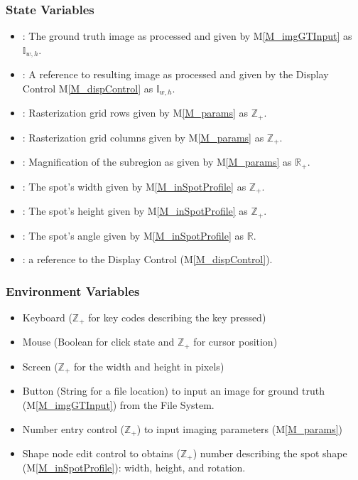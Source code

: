 \documentclass[12pt, titlepage]{article}
\newcommand{\mref}[1]{M\ref{#1}}
\newcommand{\mrefp}[1]{(\mref{#1})}
\begin{document}
\subsubsection{State Variables}
\begin{itemize}
  \item {}: The ground truth image as processed and given by \mref{M_imgGTInput} as $\mathbb{I}_{w,h}$.
  \item {}: A reference to resulting image as processed and given by the Display Control \mref{M_dispControl} as $\mathbb{I}_{w,h}$.
  \item {}: Rasterization grid rows given by \mref{M_params} as $\mathbb{Z}_+$.
  \item {}: Rasterization grid columns given by \mref{M_params} as $\mathbb{Z}_+$.
  \item {}: Magnification of the subregion as given by \mref{M_params} as $\mathbb{R}_+$.
  \item {}: The spot's width given by \mref{M_inSpotProfile} as $\mathbb{Z}_+$.
  \item {}: The spot's height given by \mref{M_inSpotProfile} as $\mathbb{Z}_+$.
  \item {}: The spot's angle given by \mref{M_inSpotProfile} as $\mathbb{R}$.
  \item {}: a reference to the Display Control \mrefp{M_dispControl}.
\end{itemize}

\subsubsection{Environment Variables}
\begin{itemize}
  \item Keyboard ($\mathbb{Z}_+$ for key codes describing the key pressed)
  \item Mouse (Boolean for click state and $\mathbb{Z}_+$ for cursor position)
  \item Screen ($\mathbb{Z}_+$ for the width and height in pixels)
  \item Button (String for a file location) to input an image for ground truth \mrefp{M_imgGTInput} from the File System.
  \item Number entry control ($\mathbb{Z}_+$) to input imaging parameters \mrefp{M_params}
  \item Shape node edit control to obtains ($\mathbb{Z}_+$) number describing the spot shape \mrefp{M_inSpotProfile}:
    width, height, and rotation.
\end{itemize}
\end{document}
